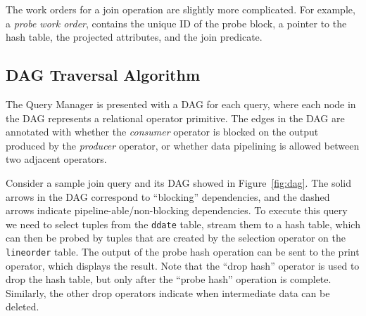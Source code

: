 The work orders for a join operation %
are slightly more complicated. 
For example, a \textit{probe work order},  contains the unique ID of the probe 
block, 
a pointer to the hash table, the projected attributes, and the join predicate.

\subsection{DAG Traversal Algorithm}\label{ssec:DAG-algo}
The Query Manager is presented with a DAG for each query, where each
node in the DAG represents a relational operator primitive.
The edges in the DAG are annotated with whether the 
\textit{consumer} operator is blocked on the output produced 
by the \textit{producer} operator, or whether data pipelining is
allowed between two adjacent operators. 

Consider a sample join query and its DAG showed in Figure~\ref{fig:dag}.
The solid arrows in the DAG correspond to ``blocking'' dependencies,
and the dashed arrows indicate pipeline-able/non-blocking dependencies. 
To execute this query we need to select tuples from the \verb+ddate+ 
table, stream them to a hash table, which can then be probed by tuples that are 
created by the selection operator on the \verb+lineorder+ table. %
The output of the probe hash operation can be sent to the print operator, which
displays the result. %
Note that the ``drop hash'' operator is used to drop the hash table, but only 
after the ``probe hash'' operation is complete. 
Similarly, the other drop operators indicate when intermediate data can be deleted. 

